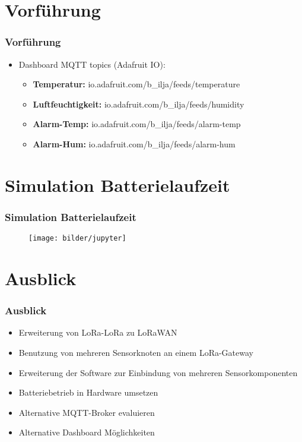 \documentclass[12pt,utf8]{beamer}
\begin{document}
\section{Vorführung}
\begin{frame}
\frametitle{Vorführung}
\begin{itemize}
\item Dashboard MQTT topics (Adafruit IO):
\begin{itemize}
 \item \textbf{Temperatur:} io.adafruit.com/b\_ilja/feeds/temperature
 \item \textbf{Luftfeuchtigkeit:} io.adafruit.com/b\_ilja/feeds/humidity
 \item \textbf{Alarm-Temp:} io.adafruit.com/b\_ilja/feeds/alarm-temp
 \item \textbf{Alarm-Hum:} io.adafruit.com/b\_ilja/feeds/alarm-hum
\end{itemize}
\end{itemize}
\end{frame}

\section{Simulation Batterielaufzeit}
\begin{frame}
\frametitle{Simulation Batterielaufzeit}
\begin{figure}
 \texttt{[image: bilder/jupyter]}
\end{figure}
\end{frame}

\section{Ausblick}
\begin{frame}
\frametitle{Ausblick}
\begin{itemize}
\item Erweiterung von LoRa-LoRa zu LoRaWAN
\item Benutzung von mehreren Sensorknoten an einem LoRa-Gateway
\item Erweiterung der Software zur Einbindung von mehreren Sensorkomponenten
\item Batteriebetrieb in Hardware umsetzen
\item Alternative MQTT-Broker evaluieren
\item Alternative Dashboard Möglichkeiten 
\end{itemize}
\end{frame}
\end{document}
